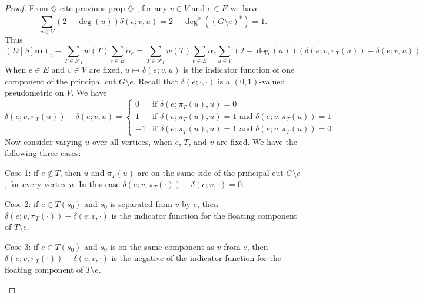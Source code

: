 \documentclass{amsart}
\theoremstyle{definition}
\newcommand{\boldm}{\mathbf{m}}
\newcommand{\trees}{\mathcal{F}_1}
\newcommand{\degout}{\deg^o}
\newcommand{\note}[1]{{\color{red} \sf $\diamondsuit$  {#1} $\diamondsuit$ }}
\begin{document}
\begin{proof}
From \note{cite previous prop}, for any $v \in V$ and $e \in E$ we have
\[
	\sum_{u \in V} (2 - \deg(u)) \delta(e; v,u) = 2 - \degout((G\setminus e)^{\overline v}) = 1. 
\] 
Thus
\[
	(D[S] \boldm)_v - \sum_{T \in \trees} w(T) \sum_{e \in E} \alpha_e = \sum_{T \in \trees} w(T) \sum_{e \in E} \alpha_e \sum_{u \in V} (2 - \deg(u)) \left(\delta(e; v, \pi_T(u)) - \delta(e; v, u) \right)
\]
When $e \in E$ and $v \in V$ are fixed, $u \mapsto \delta(e; v, u)$ is the indicator function of one component of the principal cut $G \setminus e$.
Recall that $\delta(e; \cdot,\cdot)$ is a $(0,1)$-valued pseudometric on $V$.
We have
\[
	\delta(e; v, \pi_T(u)) - \delta(e; v, u) = \begin{cases}
	0 &\text{if } \delta(e; \pi_T(u), u) = 0 \\
	1 &\text{if } \delta(e; \pi_T(u), u) = 1 \text{ and } \delta(e; v, \pi_T(u)) = 1 \\
	-1 &\text{if } \delta(e; \pi_T(u), u) = 1 \text{ and } \delta(e; v, \pi_T(u)) = 0
	\end{cases}
\]
Now consider varying $u$ over all vertices, when $e$, $T$, and $v$ are fixed.
We have the following three cases:

Case 1: if $e \not \in T$, then $u$ and $\pi_T(u)$ are on the same side of the principal cut $G \setminus e$, for every vertex $u$.
In this case $\delta(e;v, \pi_T(\cdot)) - \delta(e; v, \cdot) = 0$.

Case 2: if $e \in T(s_0)$ and $s_0$ is separated from $v$ by $e$, then $\delta(e;v, \pi_T(\cdot)) - \delta(e; v, \cdot)$ is the indicator function for the floating component of $T \setminus e$.

Case 3: if $e \in T(s_0)$ and $s_0$ is on the same component as $v$ from $e$, then $\delta(e;v, \pi_T(\cdot)) - \delta(e; v, \cdot)$ is the negative of the indicator function for the floating component of $T \setminus e$.

\begin{figure}[h]
\end{figure}
\end{proof}
\end{document}
